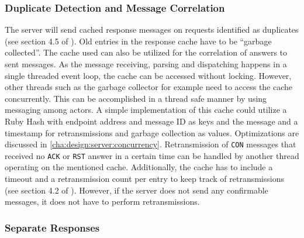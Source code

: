 		\subsubsection{Duplicate Detection and Message Correlation}

			The server will send cached response messages on requests
			identified as duplicates (see section 4.5 of \cite{coap}). Old
			entries in the response cache have to be \enquote{garbage
			collected}. The cache used can also be utilized for the correlation
			of answers to sent messages. As the message receiving, parsing and
			dispatching happens in a single threaded event loop, the cache can
			be accessed without locking. However, other threads such as the
			garbage collector for example need to access the cache
			concurrently. This can be accomplished in a thread safe manner by
			using messaging among actors. A simple implementation of this cache
			could utilize a Ruby Hash with endpoint address and message ID as
			keys and the message and a timestamp for retransmissions and
			garbage collection as values. Optimizations are discussed in
			\autoref{cha:design:server:concurrency}. Retransmission of
			\texttt{CON} messages that received no \texttt{ACK} or \texttt{RST}
			answer in a certain time can be handled by another thread operating
			on the mentioned cache. Additionally, the cache has to include a
			timeout and a retransmission count per entry to keep track of
			retransmissions (see section 4.2 of \cite{coap}). However, if the
			server does not send any confirmable messages, it does not have to
			perform retransmissions.

		\subsubsection{Separate Responses}
		\label{cha:design:server:coap:separate}

